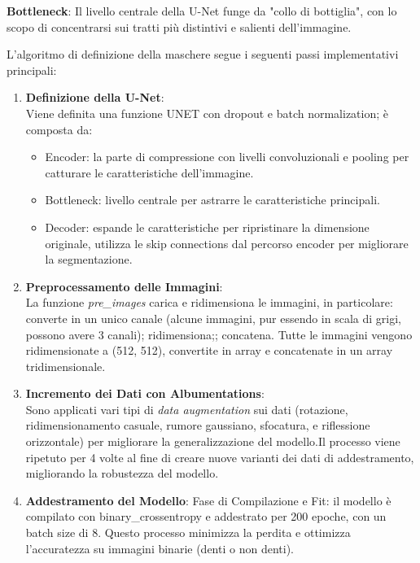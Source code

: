\documentclass[12pt,a4paper,openright,twoside]{book}
\begin{document}
\textbf{Bottleneck}: Il livello centrale della U-Net funge da "collo di bottiglia", con lo scopo di concentrarsi sui tratti più distintivi e salienti dell’immagine.

L'algoritmo di definizione della maschere segue i seguenti passi implementativi principali:
\begin{enumerate}
\item \textbf{Definizione della U-Net}:\\
Viene definita una funzione UNET con dropout e batch normalization; è composta da:
\begin{itemize}
\item Encoder: la parte di compressione con livelli convoluzionali e pooling per catturare le caratteristiche dell'immagine.
\item Bottleneck: livello centrale per astrarre le caratteristiche principali.
\item Decoder: espande le caratteristiche per ripristinare la dimensione originale, utilizza le skip connections dal percorso encoder per migliorare la segmentazione.
\end{itemize}
\begin{figure}[H]
    \centering
    
\end{figure}
\item \textbf{Preprocessamento delle Immagini}:\\
La funzione {\itshape pre\_images }carica e ridimensiona le immagini, in particolare: converte in un unico canale (alcune immagini, pur essendo in scala di grigi, possono avere 3 canali); ridimensiona;; concatena. Tutte le immagini vengono ridimensionate a (512, 512), convertite in array e concatenate in un array tridimensionale.
\item \textbf{Incremento dei Dati con Albumentations}:\\
Sono applicati vari tipi di {\itshape data augmentation} sui dati (rotazione, ridimensionamento casuale, rumore gaussiano, sfocatura, e riflessione orizzontale) per migliorare la generalizzazione del modello.Il processo viene ripetuto per 4 volte al fine di creare nuove varianti dei dati di addestramento, migliorando la robustezza del modello.
\item \textbf{Addestramento del Modello}:
Fase di Compilazione e Fit: il modello è compilato con binary\_crossentropy e addestrato per 200 epoche, con un batch size di 8. Questo processo minimizza la perdita e ottimizza l'accuratezza su immagini binarie (denti o non denti).

\end{enumerate}
\end{document}
